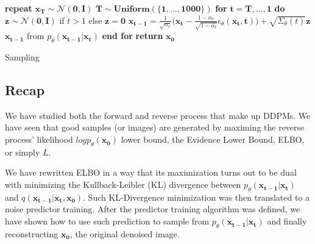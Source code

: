 \documentclass{article}
\begin{document}
\begin{algorithm} 
	\begin{algorithmic}[1]
		\State \textbf{repeat}
		\State $\mathbf{x_T \sim \mathcal{N}(0, I)}$ 
		\State $\mathbf{T \sim Uniform(\{1, \hdots, 1000\})}$ 
		\State \textbf{for} $\mathbf{t =T, \hdots, 1}$ \textbf{do}
		\State $\mathbf{z \sim \mathcal{N}(0, I)}$ if $t > 1$ else $\mathbf{z = 0}$
		\State $\mathbf{x_{t-1}} =  \frac{1}{\sqrt{\alpha_t}}\bigg( \mathbf{x_t} - \frac{1-\alpha_t}{\sqrt{1-\bar{\alpha_t}}}\epsilon_\theta(\mathbf{x_t,t})\bigg) + \sqrt{\Sigma_\theta(t)} \mathbf{z} $   $\mathbf{x_{t-1}}$ from $p_\theta (\mathbf{x_{t-1} | x_t})$
		\State \textbf{end for}
		\State \textbf{return} $\mathbf{x_0}$
	\end{algorithmic} 
	\caption{Sampling}
	\label{alg:sampling}
\end{algorithm} 


\subsection{Recap}

We have studied both the forward and reverse process that make up DDPMs. We have seen that good samples (or images) are generated by maximing the reverse process' likelihood $log p_\theta(\mathbf{x_0})$ lower bound, the Evidence Lower Bound, ELBO, or simply $L$. 

We have rewritten ELBO in a way that its maximization turns out to be dual with minimizing the Kullback-Leibler (KL) divergence between  $p_\theta (\mathbf{x_{t-1} | x_t})$ and $q(\mathbf{x_{t-1} | x_t,  x_0})$. Such KL-Divergence minimization was then translated to a noise predictor training. After the predictor training algorithm was defined, we have shown how to use such prediction to sample from  $p_\theta (\mathbf{x_{t-1} | x_t})$ and finally reconstructing $\mathbf{x_0}$, the original denoised image.





\end{document}
